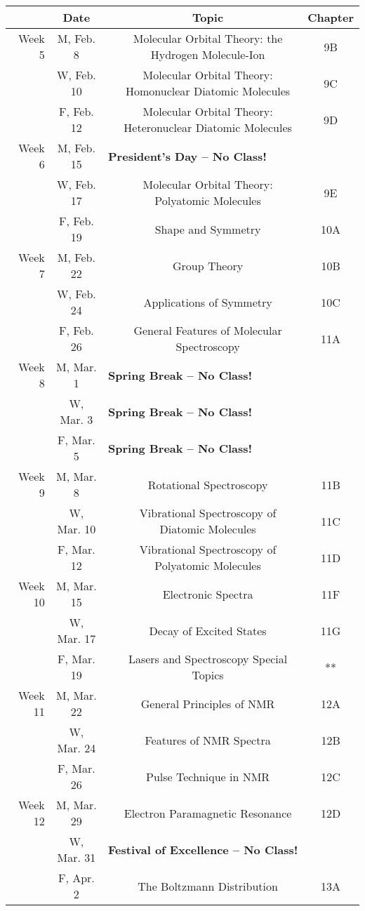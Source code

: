 \documentclass[12pt, letterpaper]{article}
\begin{document}
\noindent
\begin{tabular}{rcccc}
	& Date && Topic & Chapter\\
	\midrule
	Week 5 & M, Feb. 8&& Molecular Orbital Theory: the Hydrogen Molecule-Ion & 9B\\
	& W, Feb. 10&& Molecular Orbital Theory: Homonuclear Diatomic Molecules & 9C\\
	& F, Feb. 12&& Molecular Orbital Theory: Heteronuclear Diatomic Molecules & 9D\\
	\midrule
	Week 6 & M, Feb. 15& \multicolumn{3}{l}{\textbf{President's Day -- No Class!}}\\
	& W, Feb. 17&& Molecular Orbital Theory: Polyatomic Molecules & 9E\\
	& F, Feb. 19&& Shape and Symmetry & 10A\\
	\midrule
	Week 7 & M, Feb. 22&& Group Theory & 10B\\
	& W, Feb. 24&& Applications of Symmetry & 10C\\
	& F, Feb. 26&& General Features of Molecular Spectroscopy & 11A\\
	\midrule
	Week 8 & M, Mar. 1& \multicolumn{3}{l}{\textbf{Spring Break -- No Class!}}\\
	& W, Mar. 3& \multicolumn{3}{l}{\textbf{Spring Break -- No Class!}}\\
	& F, Mar. 5& \multicolumn{3}{l}{\textbf{Spring Break -- No Class!}}\\
	\midrule
	Week 9 & M, Mar. 8&& Rotational Spectroscopy & 11B\\
	& W, Mar. 10&& Vibrational Spectroscopy of Diatomic Molecules & 11C\\
	& F, Mar. 12&& Vibrational Spectroscopy of Polyatomic Molecules & 11D\\
	\midrule
	Week 10 & M, Mar. 15&& Electronic Spectra & 11F\\
	& W, Mar. 17&& Decay of Excited States & 11G\\
	& F, Mar. 19&& Lasers and Spectroscopy Special Topics & **\\
	\midrule
	Week 11 & M, Mar. 22&& General Principles of NMR & 12A\\
	& W, Mar. 24&& Features of NMR Spectra & 12B\\
	& F, Mar. 26&& Pulse Technique in NMR & 12C\\
	\midrule
	Week 12 & M, Mar. 29&& Electron Paramagnetic Resonance & 12D\\
	& W, Mar. 31& \multicolumn{3}{l}{\textbf{Festival of Excellence -- No Class!}}\\
	& F, Apr. 2&& The Boltzmann Distribution & 13A\\
\end{tabular}
\end{document}
